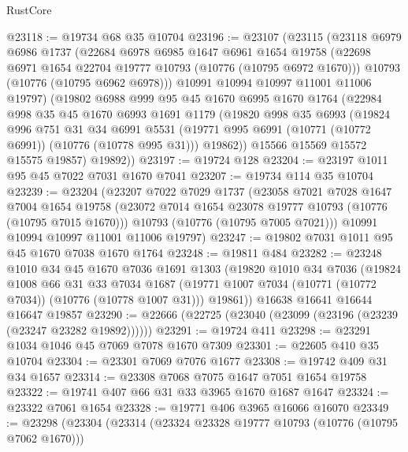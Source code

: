 \begin{lexlean}{RustCore}
\begin{coremodule}
@23118 := @19734 @68 @35 @10704
@23196 := @23107
    (@23115
      (@23118
        @6979
        @6986
        @1737
        (@22684
          @6978
          @6985
          @1647
          @6961
          @1654
          @19758
          (@22698 @6971 @1654 @22704 @19777 @10793 (@10776 (@10795 @6972 @1670)))
          @10793
          (@10776 (@10795 @6962 @6978)))
        @10991
        @10994
        @10997
        @11001
        @11006
        @19797)
      (@19802
        @6988
        @999
        @95
        @45
        @1670
        @6995
        @1670
        @1764
        (@22984
          @998
          @35
          @45
          @1670
          @6993
          @1691
          @1179
          (@19820
            @998
            @35
            @6993
            (@19824
              @996
              @751
              @31
              @34
              @6991
              @5531
              (@19771 @995 @6991 (@10771 (@10772 @6991)) (@10776 (@10778 @995 @31)))
              @19862))
          @15566
          @15569
          @15572
          @15575
          @19857)
        @19892))
@23197 := @19724 @128
@23204 := @23197 @1011 @95 @45 @7022 @7031 @1670 @7041
@23207 := @19734 @114 @35 @10704
@23239 := @23204
    (@23207
      @7022
      @7029
      @1737
      (@23058
        @7021
        @7028
        @1647
        @7004
        @1654
        @19758
        (@23072 @7014 @1654 @23078 @19777 @10793 (@10776 (@10795 @7015 @1670)))
        @10793
        (@10776 (@10795 @7005 @7021)))
      @10991
      @10994
      @10997
      @11001
      @11006
      @19797)
@23247 := @19802 @7031 @1011 @95 @45 @1670 @7038 @1670 @1764
@23248 := @19811 @484
@23282 := @23248
    @1010
    @34
    @45
    @1670
    @7036
    @1691
    @1303
    (@19820
      @1010
      @34
      @7036
      (@19824
        @1008
        @66
        @31
        @33
        @7034
        @1687
        (@19771 @1007 @7034 (@10771 (@10772 @7034)) (@10776 (@10778 @1007 @31)))
        @19861))
    @16638
    @16641
    @16644
    @16647
    @19857
@23290 := @22666 (@22725 (@23040 (@23099 (@23196 (@23239 (@23247 @23282 @19892))))))
@23291 := @19724 @411
@23298 := @23291 @1034 @1046 @45 @7069 @7078 @1670 @7309
@23301 := @22605 @410 @35 @10704
@23304 := @23301 @7069 @7076 @1677
@23308 := @19742 @409 @31 @34 @1657
@23314 := @23308 @7068 @7075 @1647 @7051 @1654 @19758
@23322 := @19741 @407 @66 @31 @33 @3965 @1670 @1687 @1647
@23324 := @23322 @7061 @1654
@23328 := @19771 @406 @3965 @16066 @16070
@23349 := @23298
    (@23304
      (@23314
        (@23324 @23328 @19777 @10793 (@10776 (@10795 @7062 @1670)))

\end{coremodule}
\end{lexlean}
